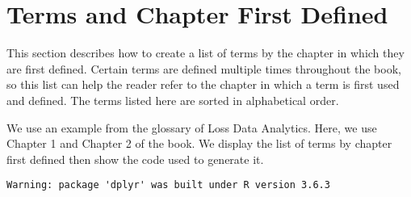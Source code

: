 \documentclass[
]{book}
\begin{document}
\hypertarget{terms-and-chapter-first-defined}{%
\section{Terms and Chapter First Defined}\label{terms-and-chapter-first-defined}}

This section describes how to create a list of terms by the chapter in which they are first defined. Certain terms are defined multiple times throughout the book, so this list can help the reader refer to the chapter in which a term is first used and defined. The terms listed here are sorted in alphabetical order.

We use an example from the glossary of Loss Data Analytics. Here, we use Chapter 1 and Chapter 2 of the book. We display the list of terms by chapter first defined then show the code used to generate it.

\begin{verbatim}
Warning: package 'dplyr' was built under R version 3.6.3
\end{verbatim}
\end{document}

